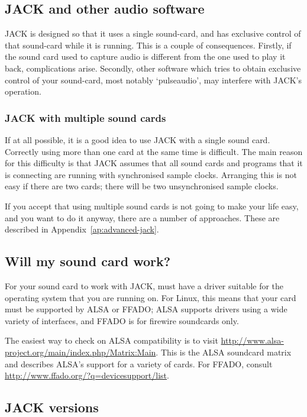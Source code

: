 \documentclass[10pt,a4paper]{book}
\begin{document}
\subsection{JACK and other audio software}

JACK is designed so that it uses a single sound-card, and has
exclusive control of that sound-card while it is running.  This is a
couple of consequences.  Firstly, if the sound card used to capture
audio is different from the one used to play it back, complications
arise.  Secondly, other software which tries to obtain exclusive
control of your sound-card, most notably `pulseaudio', may interfere
with JACK's operation.

\subsubsection{JACK with multiple sound cards}
\label{sec:jack-multiple-cards}

If at all possible, it is a good idea to use JACK with a single sound
card.  Correctly using more than one card at the same time is
difficult.  The main reason for this difficulty is that JACK assumes
that all sound cards and programs that it is connecting are running
with synchronised sample clocks.  Arranging this is not easy if there
are two cards; there will be two unsynchronised sample clocks.

If you accept that using multiple sound cards is not going to make
your life easy, and you want to do it anyway, there are a number of
approaches.  These are described in Appendix~\ref{ap:advanced-jack}.

\subsection{Will my sound card work?}

For your sound card to work with JACK, must have a driver suitable for
the operating system that you are running on.  For Linux, this means
that your card must be supported by ALSA or FFADO; ALSA supports
drivers using a wide variety of interfaces, and FFADO is for firewire
soundcards only. 

The easiest way to check on ALSA compatibility is to visit
\url{http://www.alsa-project.org/main/index.php/Matrix:Main}.  This is
the ALSA soundcard matrix and describes ALSA's support for a variety
of cards.  For FFADO, consult
\url{http://www.ffado.org/?q=devicesupport/list}.


\subsection{JACK versions}
\end{document}
